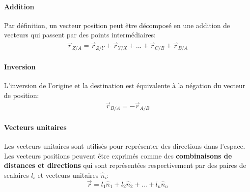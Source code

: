 \paragraph{Addition}
%
Par définition, un vecteur position peut être décomposé en une addition de vecteurs qui passent par des points intermédiaires:
\begin{align}
	\vec{r}_{Z/A}  =   \vec{r}_{Z/Y} + \vec{r}_{Y/X} + ... + \vec{r}_{C/B} + \vec{r}_{B/A}
\end{align}
%
\paragraph{Inversion}
%
L'inversion de l'origine et la destination est équivalente à la négation du vecteur de position:
\begin{align}
	\vec{r}_{B/A}  = - \vec{r}_{A/B}
\end{align}
%
\paragraph{Vecteurs unitaires}
%
Les vecteurs unitaires sont utilisés pour représenter des directions dans l'espace. Les vecteurs positions peuvent être exprimés comme des \textbf{combinaisons de distances et directions} qui sont représentées respectivement par des paires de scalaires $l_i$ et vecteurs unitaires $\hat{n}_i$:
\begin{equation}
	\vec{r} = l_1 \hat{n}_1 + l_2 \hat{n}_2 + ... + l_n \hat{n}_n
\end{equation}



